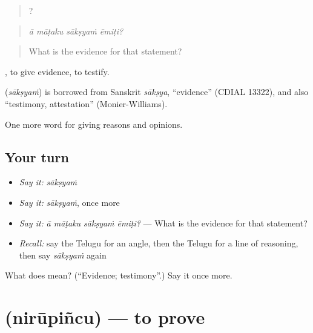 \begin{quote}
   ?
\end{quote}

\begin{quote}
\emph{ā māṭaku sākṣyaṁ ēmiṭi?}
\end{quote}

\begin{quote}
What is the evidence for that statement?
\end{quote}

 , to give evidence, to testify.

\begin{cousinweb}
\textbf{} (\emph{sākṣyaṁ}) is borrowed from Sanskrit \emph{sākṣya}, \textquotedblleft{}evidence\textquotedblright{} (CDIAL 13322), and also \textquotedblleft{}testimony, attestation\textquotedblright{} (Monier-Williams).
\end{cousinweb}

\begin{grammarlens}[title={What you've built}]
One more word for giving reasons and opinions.
\end{grammarlens}

\subsection*{Your turn}
\begin{itemize}
\raggedright
  \item \emph{Say it:} \emph{sākṣyaṁ}
  \item \emph{Say it:} \emph{sākṣyaṁ}, once more
  \item \emph{Say it:} \emph{ā māṭaku sākṣyaṁ ēmiṭi?} — What is the evidence for that statement?
  \item \emph{Recall:} say the Telugu for an angle, then the Telugu for a line of reasoning, then say \emph{sākṣyaṁ} again
\end{itemize}

\begin{tcolorbox}[breakable,colback=teal!4,colframe=teal!35!black,title={Before you move on}]
What does  mean? (\textquotedblleft{}Evidence; testimony\textquotedblright{}.) Say it once more.
\end{tcolorbox}
\section[\texorpdfstring{\te{నిరూపించు} (nirūpiñcu)}{నిరూపించు (nirūpiñcu)}]{ (nirūpiñcu) — to prove}

